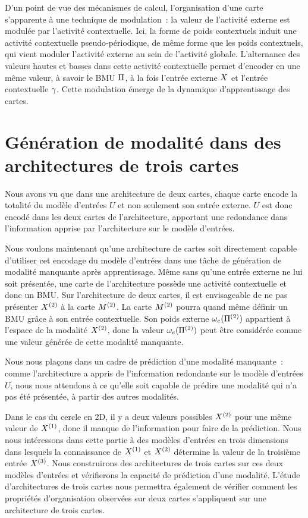 \documentclass[../main]{subfiles}
\begin{document}
D'un point de vue des mécanismes de calcul, l'organisation d'une carte s'apparente à une technique de modulation~: la valeur de l'activité externe est modulée par l'activité contextuelle. 
Ici, la forme de poids contextuels induit une activité contextuelle pseudo-périodique, de même forme que les poids contextuels, qui vient moduler l'activité externe au sein de l'activité globale. 
L'alternance des valeurs hautes et basses dans cette activité contextuelle permet d'encoder en une même valeur, à savoir le BMU $\Pi$, à la fois l'entrée externe $X$ et l'entrée contextuelle $\gamma$. Cette modulation émerge de la dynamique d'apprentissage des cartes.

\section{Génération de modalité dans des architectures de trois cartes}\label{sec:pred}

Nous avons vu que dans une architecture de deux cartes, chaque carte encode la totalité du modèle d'entrées $U$ et non seulement son entrée externe. $U$ est donc encodé dans les deux cartes de l'architecture, apportant une redondance dans l'information apprise par l'architecture sur le modèle d'entrées.

Nous voulons maintenant qu'une architecture de cartes soit directement capable d'utiliser cet encodage du modèle d'entrées dans une tâche de génération de modalité manquante après apprentissage.
Même sans qu'une entrée externe ne lui soit présentée, une carte de l'architecture possède une activité contextuelle et donc un BMU. 
Sur l'architecture de deux cartes, il est envisageable de ne pas présenter $X^{({2})}$ à la carte $M^{({2})}$. La carte $M^{({2})}$ pourra quand même définir un BMU grâce à son entrée contextuelle. 
Son poids externe $\omega_e(\Pi^{({2})})$ appartient à l'espace de la modalité $X^{({2})}$, donc la valeur $\omega_e(\Pi^{({2})})$ peut être considérée comme une valeur générée de cette modalité manquante.

Nous nous plaçons dans un cadre de prédiction d'une modalité manquante~: comme l'architecture a appris de l'information redondante sur le modèle d'entrées $U$, nous nous attendons à ce qu'elle soit capable de prédire une modalité qui n'a pas été présentée, à partir des autres modalités.

Dans le cas du cercle en 2D, il y a deux valeurs possibles $X^{({2})}$ pour une même valeur de $X^{({1})}$, donc il manque de l'information pour faire de la prédiction. Nous nous intéressons dans cette partie à des modèles d'entrées en trois dimensions dans lesquels la connaissance de $X^{({1})}$ et $X^{({2})}$ détermine la valeur de la troisième entrée $X^{({3})}$. 
Nous construirons des architectures de trois cartes sur ces deux modèles d'entrées et vérifierons la capacité de prédiction d'une modalité.
L'étude d'architectures de trois cartes nous permettra également de vérifier comment les propriétés d'organisation observées sur deux cartes s'appliquent sur une architecture de trois cartes.
\end{document}
